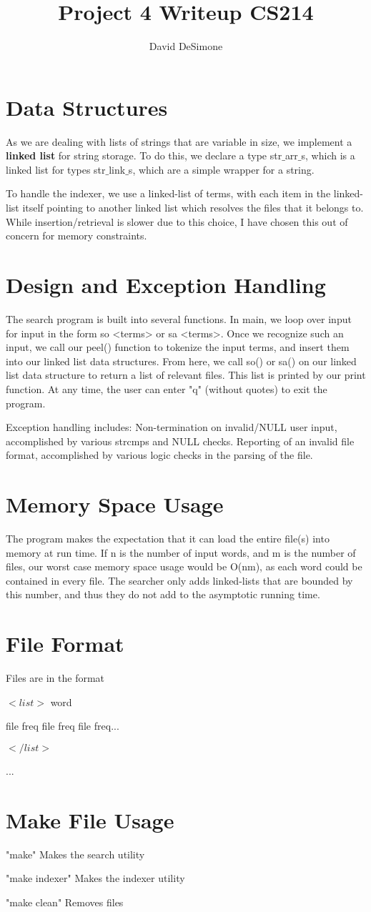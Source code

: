 \documentclass[]{article}
\title{Project 4 Writeup CS214}
\author{David DeSimone}
\begin{document}
\maketitle


\section{Data Structures} 
As we are dealing with lists of strings that are variable in size, we implement a \textbf{linked list} for string storage. To do this, we declare a type str$\_$arr$\_$s, which is a linked list for types str$\_$link$\_$s, which are a simple wrapper for a string. \par

To handle the indexer, we use a linked-list of terms, with each item in the linked-list itself pointing to another linked list which resolves the files that it belongs to. While insertion/retrieval is slower due to this choice, I have chosen this out of concern for memory constraints.  

\section{Design and Exception Handling}
The search program is built into several functions. In main, we loop over input for input in the form so <terms> or sa <terms>. Once we recognize such an input, we call our peel() function to tokenize the input terms, and insert them into our linked list data structures. From here, we call so() or sa() on our linked list data structure to return a list of relevant files. This list is printed by our print function. At any time, the user can enter "q" (without quotes) to exit the program. \par

Exception handling includes: Non-termination on invalid/NULL user input, accomplished by various strcmps and NULL checks. Reporting of an invalid file format, accomplished by various logic checks in the parsing of the file. 

\section{Memory Space Usage}
The program makes the expectation that it can load the entire file(s) into memory at run time. If n is the number of input words, and m is the number of files, our worst case memory space usage would be O(nm), as each word could be contained in every file. The searcher only adds linked-lists that are bounded by this number, and thus they do not add to the asymptotic running time. 

\section{File Format}
Files are in the format \par
$<list>$ word \par
file freq file freq file freq...\par
$</list>$\par
...

\section{Make File Usage}
"make" Makes the search utility \par
"make indexer" Makes the indexer utility \par
"make clean" Removes files  \par
\end{document}
